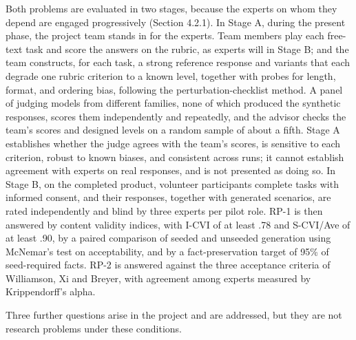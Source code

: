 Both problems are evaluated in two stages, because the experts on whom they depend are engaged progressively (Section 4.2.1). In Stage A, during the present phase, the project team stands in for the experts. Team members play each free-text task and score the answers on the rubric, as experts will in Stage B; and the team constructs, for each task, a strong reference response and variants that each degrade one rubric criterion to a known level, together with probes for length, format, and ordering bias, following the perturbation-\allowbreak{}checklist method\cite{r73}. A panel of judging models from different families, none of which produced the synthetic responses, scores them independently and repeatedly\cite{r74}, and the advisor checks the team's scores and designed levels on a random sample of about a fifth. Stage A establishes whether the judge agrees with the team's scores, is sensitive to each criterion, robust to known biases, and consistent across runs; it cannot establish agreement with experts on real responses, and is not presented as doing so. In Stage B, on the completed product, volunteer participants complete tasks with informed consent, and their responses, together with generated scenarios, are rated independently and blind by three experts per pilot role. RP-1 is then answered by content validity indices, with I-CVI of at least .78 and S-CVI/Ave of at least .90\cite{r70}, by a paired comparison of seeded and unseeded generation using McNemar's test on acceptability, and by a fact-\allowbreak{}preservation target of 95\% of seed-\allowbreak{}required facts. RP-2 is answered against the three acceptance criteria of Williamson, Xi and Breyer\cite{r71}, with agreement among experts measured by Krippendorff's alpha\cite{r72}.

Three further questions arise in the project and are addressed, but they are not research problems under these conditions.

